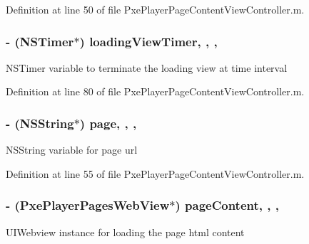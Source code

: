 Definition at line 50 of file Pxe\-Player\-Page\-Content\-View\-Controller.\-m.

\hypertarget{category_pxe_player_page_content_view_controller_07_08_a2dd826b7fd5d227afac08b130812ebb6}{
\subsubsection[{loading\-View\-Timer}]{\setlength{\rightskip}{0pt plus 5cm}-\/ (N\-S\-Timer$\ast$) loading\-View\-Timer\hspace{0.3cm}{\ttfamily [read]}, {\ttfamily [write]}, {\ttfamily [nonatomic]}, {\ttfamily [assign]}}}\label{category_pxe_player_page_content_view_controller_07_08_a2dd826b7fd5d227afac08b130812ebb6}
N\-S\-Timer variable to terminate the loading view at time interval 

Definition at line 80 of file Pxe\-Player\-Page\-Content\-View\-Controller.\-m.

\hypertarget{category_pxe_player_page_content_view_controller_07_08_a482fc28ef887b97f6a6aefdee082900c}{
\subsubsection[{page}]{\setlength{\rightskip}{0pt plus 5cm}-\/ (N\-S\-String$\ast$) page\hspace{0.3cm}{\ttfamily [read]}, {\ttfamily [write]}, {\ttfamily [nonatomic]}, {\ttfamily [strong]}}}\label{category_pxe_player_page_content_view_controller_07_08_a482fc28ef887b97f6a6aefdee082900c}
N\-S\-String variable for page url 

Definition at line 55 of file Pxe\-Player\-Page\-Content\-View\-Controller.\-m.

\hypertarget{category_pxe_player_page_content_view_controller_07_08_aabac4af63563001986de19c537ba14a7}{
\subsubsection[{page\-Content}]{\setlength{\rightskip}{0pt plus 5cm}-\/ ({\bf Pxe\-Player\-Pages\-Web\-View}$\ast$) page\-Content\hspace{0.3cm}{\ttfamily [read]}, {\ttfamily [write]}, {\ttfamily [nonatomic]}, {\ttfamily [strong]}}}\label{category_pxe_player_page_content_view_controller_07_08_aabac4af63563001986de19c537ba14a7}
U\-I\-Webview instance for loading the page html content 

